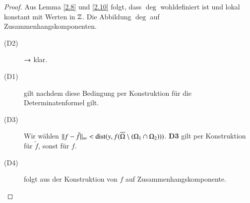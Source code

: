 \begin{proof}

Aus Lemma \ref{2.8} und \ref{2.10} folgt, dass $\deg$ wohldefiniert ist und lokal konstant mit 
Werten in $\mathbb{Z}$. Die Abbildung $\deg$ auf Zusammenhangskomponenten.
\begin{description}
\item[(D2)] $\rightarrow$ klar.
\item[(D1)] gilt nachdem diese Bedingung per Konstruktion für die Determinatenformel gilt.
\item[(D3)] Wir wählen $\|f-\tilde f\|_\infty<\mathrm{dist}(y,f(\overline \Omega\setminus(\Omega_1\cap \Omega_2)))$.
    \textbf{D3} gilt per Konstruktion für $\tilde f$, sonst für $f$.
\item[(D4)] folgt aus der Konstruktion von $f$ auf Zusammenhangskomponente.
\end{description}
\[ \]
\end{proof}

